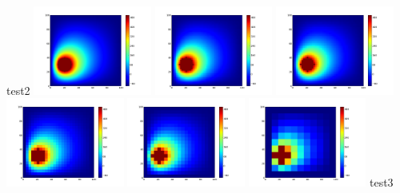 \documentclass[spanish,a4paper]{article}
\begin{document}
test2 \newline
\includegraphics[width=110pt]{Parabrisas2-1.png} \includegraphics[width=110pt]{Parabrisas2-2.png} \includegraphics[width=110pt]{Parabrisas2-2,5.png} \newline \includegraphics[width=110pt]{Parabrisas2-4.png} \includegraphics[width=110pt]{Parabrisas2-5.png} \includegraphics[width=110pt]{Parabrisas2-10.png} \newline
\newline
\newline
\newline
test3 \newline
\end{document}
